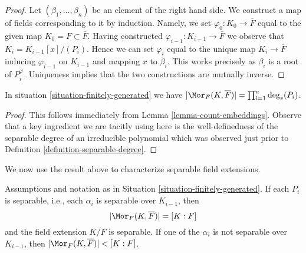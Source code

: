 \begin{proof}
Let $(\beta_1, \ldots, \beta_n)$ be an element of the right hand side.
We construct a map of fields corresponding to it by induction.
Namely, we set $\varphi_0 : K_0 \to \overline{F}$ equal to the given
map $K_0 = F \subset \overline{F}$. Having constructed
$\varphi_{i - 1} : K_{i - 1} \to \overline{F}$ we observe that
$K_i = K_{i - 1}[x]/(P_i)$. Hence we can set $\varphi_i$ equal
to the unique map $K_i \to \overline{F}$ inducing $\varphi_{i - 1}$
on $K_{i - 1}$ and mapping $x$ to $\beta_i$. This works precisely
as $\beta_i$ is a root of $P_i^\varphi$. Uniqueness implies that
the two constructions are mutually inverse.
\end{proof}

\begin{lemma}
\label{lemma-count-embeddings-explicitly}
In situation \ref{situation-finitely-generated} we have
$|\Mor_F(K, \overline{F})| = \prod_{i = 1}^n \deg_s(P_i)$.
\end{lemma}

\begin{proof}
This follows immediately from Lemma \ref{lemma-count-embeddings}.
Observe that a key ingredient we are tacitly using here is the
well-definedness of the separable degree of an irreducible polynomial
which was observed just prior to
Definition \ref{definition-separable-degree}.
\end{proof}

\noindent
We now use the result above to characterize separable field extensions.

\begin{lemma}
\label{lemma-separably-generated-separable}
Assumptions and notation as in Situation \ref{situation-finitely-generated}.
If each $P_i$ is separable, i.e., each $\alpha_i$ is separable over
$K_{i - 1}$, then
$$
|\Mor_F(K, \overline{F})| = [K : F]
$$
and the field extension $K/F$ is separable. If one of the $\alpha_i$ is
not separable over $K_{i - 1}$, then
$|\Mor_F(K, \overline{F})| < [K : F]$.
\end{lemma}

